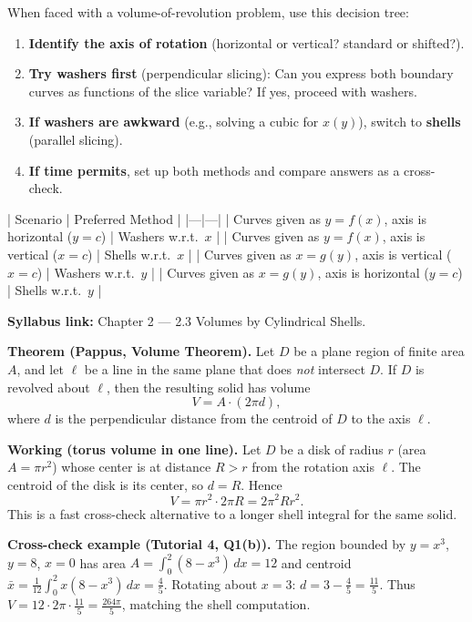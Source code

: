 \begin{examtip}[title={Exam Focus: Method comparison decision tree}]
When faced with a volume-of-revolution problem, use this decision tree:
\begin{enumerate}[label=(\arabic*), leftmargin=*]
\item \textbf{Identify the axis of rotation} (horizontal or vertical? standard or shifted?).
\item \textbf{Try washers first} (perpendicular slicing): Can you express both boundary curves as functions of the slice variable? If yes, proceed with washers.
\item \textbf{If washers are awkward} (e.g., solving a cubic for $x(y)$), switch to \textbf{shells} (parallel slicing).
\item \textbf{If time permits}, set up both methods and compare answers as a cross-check.
\end{enumerate}

| Scenario | Preferred Method |
|---|---|
| Curves given as $y=f(x)$, axis is horizontal ($y=c$) | Washers w.r.t.\ $x$ |
| Curves given as $y=f(x)$, axis is vertical ($x=c$) | Shells w.r.t.\ $x$ |
| Curves given as $x=g(y)$, axis is vertical ($x=c$) | Washers w.r.t.\ $y$ |
| Curves given as $x=g(y)$, axis is horizontal ($y=c$) | Shells w.r.t.\ $y$ |
\end{examtip}

\begin{extension}[title={Extension (Beyond Syllabus: Pappus's centroid theorem for volumes)}]
\textbf{Syllabus link:} Chapter 2 — 2.3 Volumes by Cylindrical Shells.

\textbf{Theorem (Pappus, Volume Theorem).}
Let $D$ be a plane region of finite area $A$, and let $\ell$ be a line in the same plane that does \emph{not} intersect $D$.
If $D$ is revolved about $\ell$, then the resulting solid has volume
\[
V = A\cdot (2\pi d),
\]
where $d$ is the perpendicular distance from the centroid of $D$ to the axis $\ell$.

\textbf{Working (torus volume in one line).}
Let $D$ be a disk of radius $r$ (area $A=\pi r^2$) whose center is at distance $R>r$ from the rotation axis $\ell$.
The centroid of the disk is its center, so $d=R$. Hence
\[
V=\pi r^2\cdot 2\pi R = 2\pi^2 R r^2.
\]
This is a fast cross-check alternative to a longer shell integral for the same solid.

\textbf{Cross-check example (Tutorial 4, Q1(b)).} The region bounded by $y=x^3$, $y=8$, $x=0$ has area $A=\int_0^2(8-x^3)\,dx=12$ and centroid $\bar{x}=\frac{1}{12}\int_0^2 x(8-x^3)\,dx=\frac{4}{5}$. Rotating about $x=3$: $d=3-\frac{4}{5}=\frac{11}{5}$. Thus $V=12\cdot 2\pi\cdot\frac{11}{5}=\frac{264\pi}{5}$, matching the shell computation.
\end{extension}

